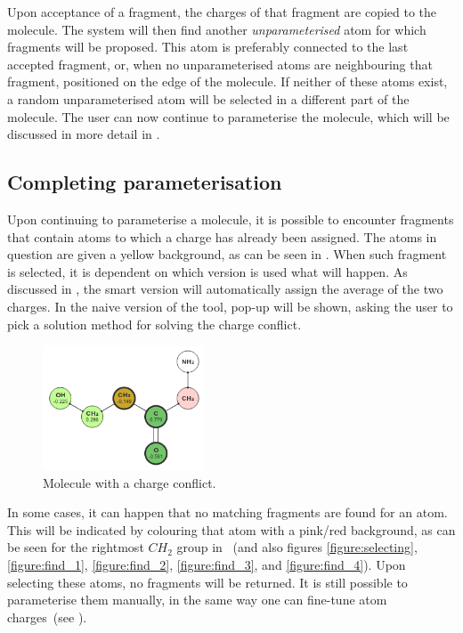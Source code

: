Upon acceptance of a fragment, the charges of that fragment are copied to the molecule. The system will then find another \emph{unparameterised} atom for which fragments will be proposed. This atom is preferably connected to the last accepted fragment, or, when no unparameterised atoms are neighbouring that fragment, positioned on the edge of the molecule. If neither of these atoms exist, a random unparameterised atom will be selected in a different part of the molecule. The user can now continue to parameterise the molecule, which will be discussed in more detail in .


\subsection{Completing parameterisation}
Upon continuing to parameterise a molecule, it is possible to encounter fragments that contain atoms to which a charge has already been assigned. The atoms in question are given a yellow background, as can be seen in . When such fragment is selected, it is dependent on which \oframp{} version is used what will happen. As discussed in \secref{}, the smart version will automatically assign the average of the two charges. In the naive version of the tool, pop-up will be shown, asking the user to pick a solution method for solving the charge conflict.

\begin{figure}
\center
\includegraphics[height=140px]{img/conflict.png}
\caption{Molecule with a charge conflict.}
\end{figure}

In some cases, it can happen that no matching fragments are found for an atom. This will be indicated by colouring that atom with a pink/red background, as can be seen for the rightmost $CH_{2}$ group in ~(and also figures \ref{figure:selecting}, \ref{figure:find_1}, \ref{figure:find_2}, \ref{figure:find_3}, and \ref{figure:find_4}). Upon selecting these atoms, no fragments will be returned. It is still possible to parameterise them manually, in the same way one can fine-tune atom charges~(see ).


